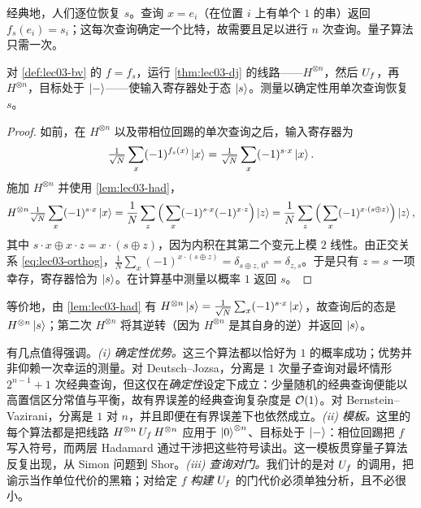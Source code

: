 经典地，人们逐位恢复 $s$。查询 $x=e_i$（在位置 $i$ 上有单个 $1$ 的串）返回 $f_s(e_i)=s_i$；这每次查询确定一个比特，故需要且足以进行 $n$ 次查询。量子算法只需一次。

\begin{theorem}
\label{thm:lec03-bv}
对 \cref{def:lec03-bv} 的 $f=f_s$，运行 \cref{thm:lec03-dj} 的线路——$H^{\otimes n}$，然后 $U_{f}$，再 $H^{\otimes n}$，目标处于 $\ket{-}$——使输入寄存器处于态 $\ket{s}$。测量以确定性用单次查询恢复 $s$。
\end{theorem}

\begin{proof}
如前，在 $H^{\otimes n}$ 以及带相位回踢的单次查询之后，输入寄存器为
\[
  \tfrac{1}{\sqrt N}\sum_{x}(-1)^{f_s(x)}\ket{x}
  =\tfrac{1}{\sqrt N}\sum_{x}(-1)^{s\cdot x}\ket{x}.
\]
施加 $H^{\otimes n}$ 并使用 \cref{lem:lec03-had}，
\[
  H^{\otimes n}\tfrac{1}{\sqrt N}\sum_{x}(-1)^{s\cdot x}\ket{x}
  =\frac{1}{N}\sum_{z}\Big(\sum_{x}(-1)^{s\cdot x}(-1)^{x\cdot z}\Big)\ket{z}
  =\frac{1}{N}\sum_{z}\Big(\sum_{x}(-1)^{x\cdot(s\oplus z)}\Big)\ket{z},
\]
其中 $s\cdot x\oplus x\cdot z=x\cdot(s\oplus z)$，因为内积在其第二个变元上模 $2$ 线性。由正交关系 \eqref{eq:lec03-orthog}，$\tfrac{1}{N}\sum_{x}(-1)^{x\cdot(s\oplus z)}
=\delta_{s\oplus z,\,0^n}=\delta_{z,s}$。于是只有 $z=s$ 一项幸存，寄存器恰为 $\ket{s}$。在计算基中测量以概率 $1$ 返回 $s$。
\end{proof}

等价地，由 \cref{lem:lec03-had} 有 $H^{\otimes n}\ket{s}=\tfrac{1}{\sqrt N}\sum_x(-1)^{s\cdot x}\ket{x}$，故查询后的态是 $H^{\otimes n}\ket{s}$；第二次 $H^{\otimes n}$ 将其逆转（因为 $H^{\otimes n}$ 是其自身的逆）并返回 $\ket{s}$。

\begin{remark}[统一模式及其局限]
\label{rem:lec03-significance}
有几点值得强调。\emph{(i) 确定性优势。}这三个算法都以恰好为 $1$ 的概率成功；优势并非仰赖一次幸运的测量。对 Deutsch--Jozsa，分离是 $1$ 次量子查询对最坏情形 $2^{n-1}+1$ 次经典查询，但这仅在\emph{确定性}设定下成立：少量随机的经典查询便能以高置信区分常值与平衡，故有界误差的经典查询复杂度是 $\mathcal{O}(1)$。对 Bernstein--Vazirani，分离是 $1$ 对 $n$，并且即便在有界误差下也依然成立。\emph{(ii) 模板。}这里的每个算法都是把线路 $H^{\otimes n}\,U_{f}\,H^{\otimes n}$ 应用于 $\ket{0}^{\otimes n}$、目标处于 $\ket{-}$：相位回踢把 $f$ 写入符号，而两层 Hadamard 通过干涉把这些符号读出。这一模板贯穿量子算法反复出现，从 Simon 问题到 Shor。\emph{(iii) 查询对门。}我们计的是对 $U_{f}$ 的调用，把谕示当作单位代价的黑箱；对给定 $f$ \emph{构建} $U_{f}$ 的门代价必须单独分析，且不必很小。
\end{remark}
